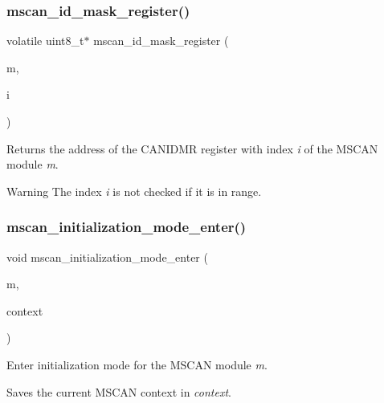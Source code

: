 \subsubsection{\texorpdfstring{mscan\_id\_mask\_register()}{mscan\_id\_mask\_register()}}
{\footnotesize\ttfamily volatile uint8\+\_\+t$\ast$ mscan\+\_\+id\+\_\+mask\+\_\+register (\begin{DoxyParamCaption}\item[{volatile \mbox{\hyperlink{group__RTEMSBSPsPowerPCGen5200MSCAN_gacfd56a4a482c5e7da2cff003284b2d51}{mscan}} $\ast$}]{m,  }\item[{unsigned}]{i }\end{DoxyParamCaption})}



Returns the address of the C\+A\+N\+I\+D\+MR register with index {\itshape i} of the M\+S\+C\+AN module {\itshape m}. 

\begin{DoxyWarning}{Warning}
The index {\itshape i} is not checked if it is in range. 
\end{DoxyWarning}
\mbox{\label{group__RTEMSBSPsPowerPCGen5200MSCAN_ga587e0d7b0c1d090fda013c551f02a3f7}} 
\subsubsection{\texorpdfstring{mscan\_initialization\_mode\_enter()}{mscan\_initialization\_mode\_enter()}}
{\footnotesize\ttfamily void mscan\+\_\+initialization\+\_\+mode\+\_\+enter (\begin{DoxyParamCaption}\item[{volatile \mbox{\hyperlink{group__RTEMSBSPsPowerPCGen5200MSCAN_gacfd56a4a482c5e7da2cff003284b2d51}{mscan}} $\ast$}]{m,  }\item[{\mbox{\hyperlink{structmscan__context}{mscan\+\_\+context}} $\ast$}]{context }\end{DoxyParamCaption})}



Enter initialization mode for the M\+S\+C\+AN module {\itshape m}. 

Saves the current M\+S\+C\+AN context in {\itshape context}. \mbox{\label{group__RTEMSBSPsPowerPCGen5200MSCAN_ga29478727b755ce8d81ded34969194a1b}} 
